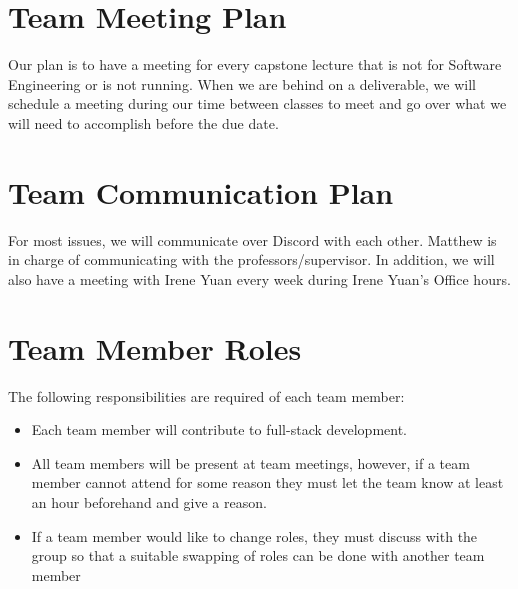 \documentclass{article}
\begin{document}
\section{Team Meeting Plan}

Our plan is to have a meeting for every capstone lecture that is not for Software Engineering or is not running. When we are behind on a deliverable, we will schedule a meeting during our time between classes to meet and go over what we will need to accomplish before the due date.

\section{Team Communication Plan}
For most issues, we will communicate over Discord with each other. Matthew is in charge of communicating with the professors/supervisor. In addition, we will also have a meeting with Irene Yuan every week during Irene Yuan's Office hours. 
\newpage
\section{Team Member Roles}
The following responsibilities are required of each team member:
\begin{itemize}
    \item Each team member will contribute to full-stack development.
    \item All team members will be present at team meetings, however, if a team member cannot attend for some reason they must let the team know at least an hour beforehand and give a reason.
    \item If a team member would like to change roles, they must discuss with the group so that a suitable swapping of roles can be done with another team member
\end{itemize}
\end{document}
